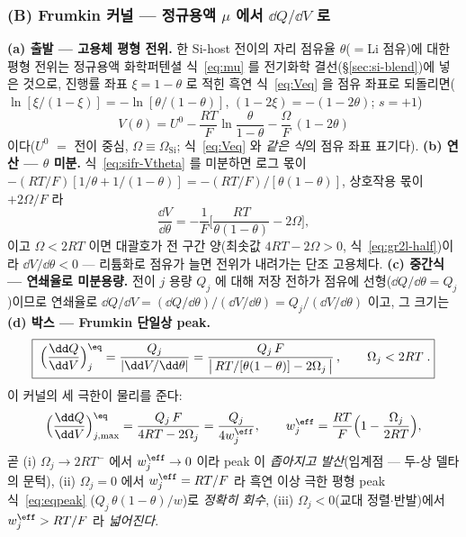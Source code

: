 \subsubsection*{(B) Frumkin 커널 --- 정규용액 $\mu$ 에서 $\dd Q/\dd V$ 로}
\textbf{(a) 출발 --- 고용체 평형 전위.} 한 Si-host 전이의 자리 점유율 $\theta$($=$Li 점유)에 대한 평형 전위는
정규용액 화학퍼텐셜 식~\eqref{eq:mu} 를 전기화학 결선(\S\ref{sec:si-blend})에 넣은 것으로, 진행률 좌표
$\xi=1-\theta$ 로 적힌 흑연 식~\eqref{eq:Veq} 을 점유 좌표로 되돌리면($\ln[\xi/(1-\xi)]=-\ln[\theta/(1-\theta)]$,
$(1-2\xi)=-(1-2\theta)$; $s=+1$)
\begin{equation}
V(\theta)=U^0-\frac{RT}{F}\ln\frac{\theta}{1-\theta}-\frac{\Omega}{F}\,(1-2\theta)
\label{eq:sifr-Vtheta}
\end{equation}
이다($U^0$ $=$ 전이 중심, $\Omega\equiv\Omega_\mathrm{Si}$; 식~\eqref{eq:Veq} 와 \emph{같은 식}의 점유
좌표 표기다). \textbf{(b) 연산 --- $\theta$ 미분.} 식~\eqref{eq:sifr-Vtheta} 를 미분하면 로그 몫이
$-(RT/F)[1/\theta+1/(1-\theta)]=-(RT/F)/[\theta(1-\theta)]$, 상호작용 몫이 $+2\Omega/F$ 라
\begin{equation}
\frac{\dd V}{\dd\theta}=-\frac{1}{F}\Big[\frac{RT}{\theta(1-\theta)}-2\Omega\Big],
\label{eq:sifr-dVdtheta}
\end{equation}
이고 $\Omega<2RT$ 이면 대괄호가 전 구간 양(최솟값 $4RT-2\Omega>0$, 식~\eqref{eq:gr2l-half})이라 $\dd V/\dd\theta<0$
--- 리튬화로 점유가 늘면 전위가 내려가는 단조 고용체다. \textbf{(c) 중간식 --- 연쇄율로 미분용량.} 전이 $j$
용량 $Q_j$ 에 대해 저장 전하가 점유에 선형($\dd Q/\dd\theta=Q_j$)이므로 연쇄율로
$\dd Q/\dd V=(\dd Q/\dd\theta)/(\dd V/\dd\theta)=Q_j/(\dd V/\dd\theta)$ 이고, 그 크기는
\textbf{(d) 박스 --- Frumkin 단일상 peak.}
\begin{equation}
\boxed{\;\Big(\frac{\dd Q}{\dd V}\Big)^{\eq}_j=\frac{Q_j}{\lvert\dd V/\dd\theta\rvert}
=\frac{Q_j\,F}{\big\lvert\,RT/[\theta(1-\theta)]-2\Omega_j\,\big\rvert}\,,\qquad \Omega_j<2RT\;.}
\label{eq:sifr-kernel}
\end{equation}
이 커널의 세 극한이 물리를 준다:
\begin{equation}
\Big(\frac{\dd Q}{\dd V}\Big)^{\eq}_{j,\max}=\frac{Q_j\,F}{4RT-2\Omega_j}=\frac{Q_j}{4w_j^{\eff}},
\qquad
w_j^{\eff}=\frac{RT}{F}\Big(1-\frac{\Omega_j}{2RT}\Big),
\label{eq:sifr-limits}
\end{equation}
곧 (i) $\Omega_j\to2RT^-$ 에서 $w_j^{\eff}\to0$ 이라 peak 이 \emph{좁아지고 발산}(임계점 --- 두-상 델타의
문턱), (ii) $\Omega_j=0$ 에서 $w_j^{\eff}=RT/F$ 라 흑연 이상 극한 평형 peak 식~\eqref{eq:eqpeak}
($Q_j\,\theta(1-\theta)/w$)로 \emph{정확히 회수}, (iii) $\Omega_j<0$(교대 정렬$\cdot$반발)에서 $w_j^{\eff}>RT/F$
라 \emph{넓어진다}.


